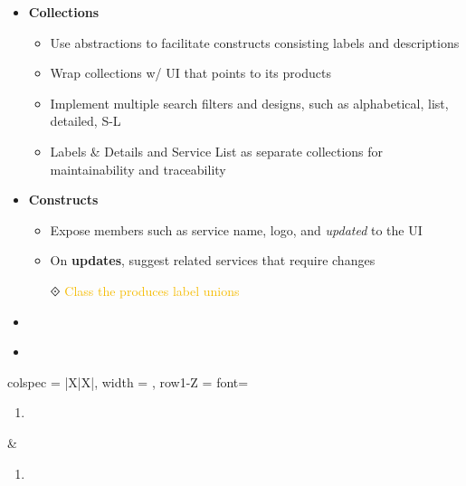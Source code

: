 \documentclass[7px]{article}
\begin{document}
{
  \begin{itemize}[label=\textsection]
    \item {\textbf{Collections}}
      \small
      \begin{itemize}[label=$\multimapdotinv$, leftmargin=3mm]
        \item Use abstractions to facilitate constructs consisting labels and descriptions
        \item Wrap collections w/ UI that points to its products
        \item Implement multiple search filters and designs, such as alphabetical, list, detailed, S-L
        \item Labels \& Details and Service List as separate collections for maintainability and traceability
      \end{itemize}
      \normalsize
    \item {\textbf{Constructs}}
      \small
      \begin{itemize}[label=$\multimapdotinv$, leftmargin=3mm]
        \item Expose members such as service name, logo, and \textsl{updated} to the UI 
        \item On \textbf{updates}, suggest related services that require changes
        \item[$\Diamonddot$] \textcolor[HTML]{F5BB00}{Class the produces label unions}
      \end{itemize}
      \normalsize
  \end{itemize}
}
{
  \raggedright
  \begin{itemize}[label=\blitzb]
    \small
    \item 
  \end{itemize}
}

\deploy
{
  \begin{itemize}
    \item 
  \end{itemize}
}
{
 \raggedright
  \begin{tblr}{
      colspec = {|X|X|}, width = \linewidth,
      row{1-Z} = {font=\scriptsize}
    }
    {
      \begin{minipage}[t]{\linewidth}
        \vspace{-2.3em}
        \begin{enumerate}
          \item 
        \end{enumerate}
      \end{minipage}
    } & {
      \begin{minipage}[t]{\linewidth}
        \vspace{-2.3em}
        \begin{enumerate}
          \item 
        \end{enumerate}
      \end{minipage}
    } \\
  \end{tblr}
}
\end{document}
